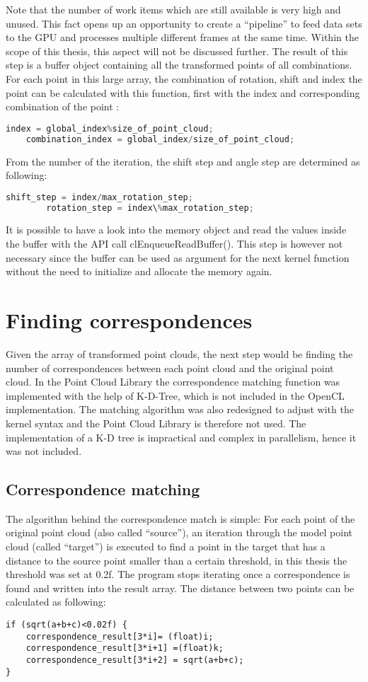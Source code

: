 Note that the number of work items which are still available is very high and unused. This fact opens up an opportunity to create a “pipeline” to feed data sets  to the GPU and processes multiple different frames at the same time. Within the scope of this thesis, this aspect will not be discussed further. 
The result of this step is a buffer object containing all the transformed points of all combinations. For each point in this large array, the combination  of rotation, shift and index the point can be calculated with this function, first with the index and corresponding combination of the point  :
\begin{lstlisting}[language=C]
 	index = global_index%size_of_point_cloud;
 	combination_index = global_index/size_of_point_cloud;
\end{lstlisting}


From the number of the iteration, the shift step and angle step are determined as following:
\begin{lstlisting}[language=C]
	shift_step = index/max_rotation_step;
    	rotation_step = index\%max_rotation_step;    
\end{lstlisting}    

    
It is possible to have a look into the memory object and read the values inside the buffer with the API call clEnqueueReadBuffer(). This step is however not necessary since the buffer can be used as argument for the next kernel function without the need to initialize and allocate the memory again. 
\newpage
\section{Finding correspondences}
Given the array of transformed point clouds, the next step would be finding the number of correspondences between each point cloud and the original point cloud. In the Point Cloud Library the correspondence matching function was implemented with the help of K-D-Tree, which is not included in the OpenCL implementation. The matching algorithm was also redesigned to adjust with the kernel syntax and the Point Cloud Library is therefore not used. The implementation of a K-D tree is impractical and complex in parallelism, hence it was not included.
\subsection{Correspondence matching}
The algorithm behind the correspondence match is simple: For each point of the original point cloud (also called “source”), an iteration through the model point cloud (called “target”) is executed to find a point in the target that has a distance to the source point smaller than a certain threshold, in this thesis the threshold was set at 0.2f. The program stops iterating once a correspondence is found and written into the result array. The distance between two points can be calculated as following:
\begin{lstlisting}
if (sqrt(a+b+c)<0.02f) {       
    correspondence_result[3*i]= (float)i;
    correspondence_result[3*i+1] =(float)k;
    correspondence_result[3*i+2] = sqrt(a+b+c);
}
   
\end{lstlisting}  

